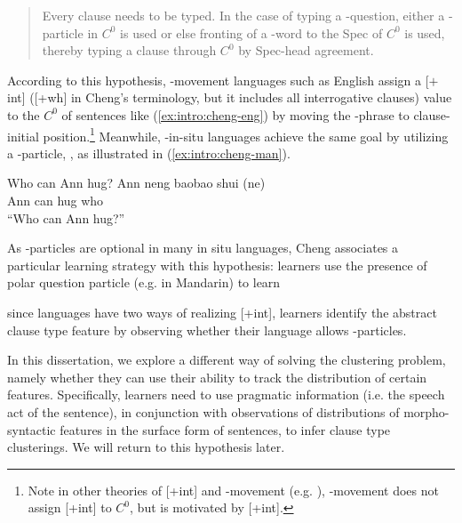 \begin{quote}
Every clause needs to be typed. In the case of typing a \twh-question, either a \twh-particle in $C^{0}$ is used or else fronting of a \twh-word to the Spec of $C^{0}$ is used, thereby typing a clause through $C^{0}$ by Spec-head agreement. \hfill \textcite[p.29]{cheng1991}

\end{quote}


According to this hypothesis, \twh-movement languages such as English assign a [$+$int] ([+wh] in Cheng's terminology, but it includes all interrogative clauses) value to the $C^{0}$ of sentences like (\ref{ex:intro:cheng-eng}) by moving the \twh-phrase to clause-initial position.\footnote{Note in other theories of [+int] and \twh-movement (e.g. \cite{chomsky1995}), \twh-movement does not assign [+int] to $C^{0}$, but is motivated by [+int]. } Meanwhile, \twh-in-situ languages achieve the same goal by utilizing a \twh-particle, , as illustrated in (\ref{ex:intro:cheng-man}).

Who can Ann hug?
\eex
{}
\gll
Ann neng baobao shui (ne)\\
Ann can hug who \Sfp\\
\trans ``Who can Ann hug?''
\eex

As \twh-particles are optional in many in situ languages, Cheng associates a particular learning strategy with this hypothesis: learners use the presence of polar question particle (e.g.  in Mandarin) to learn

since languages have two ways of realizing [+int], learners identify the abstract clause type feature by observing whether their language allows \twh-particles. 


In this dissertation, we explore a different way of solving the clustering problem, namely whether they can use their ability to track the distribution of certain features. Specifically, learners need to use pragmatic information (i.e. the speech act of the sentence), in conjunction with observations of distributions of morpho-syntactic features in the surface form of sentences, to infer clause type clusterings. We will return to this hypothesis later. 



